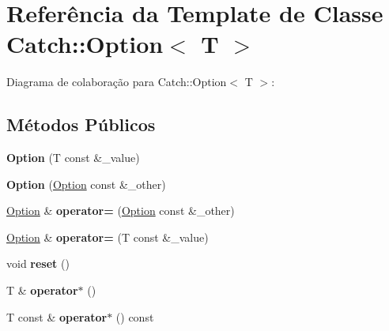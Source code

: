 \hypertarget{classCatch_1_1Option}{}\section{Referência da Template de Classe Catch\+:\+:Option$<$ T $>$}
\label{classCatch_1_1Option}


Diagrama de colaboração para Catch\+:\+:Option$<$ T $>$\+:
\subsection*{Métodos Públicos}
\begin{DoxyCompactItemize}
\item 
{\bfseries Option} (T const \&\+\_\+value)\hypertarget{classCatch_1_1Option_a5aeb9c22d48a6882bdf5fb4730b06c86}{}\label{classCatch_1_1Option_a5aeb9c22d48a6882bdf5fb4730b06c86}

\item 
{\bfseries Option} (\hyperlink{classCatch_1_1Option}{Option} const \&\+\_\+other)\hypertarget{classCatch_1_1Option_af02f2e4559f06384baec0def8c68c5fd}{}\label{classCatch_1_1Option_af02f2e4559f06384baec0def8c68c5fd}

\item 
\hyperlink{classCatch_1_1Option}{Option} \& {\bfseries operator=} (\hyperlink{classCatch_1_1Option}{Option} const \&\+\_\+other)\hypertarget{classCatch_1_1Option_a78c65b15dd6b2fbd04c5012c43017c8f}{}\label{classCatch_1_1Option_a78c65b15dd6b2fbd04c5012c43017c8f}

\item 
\hyperlink{classCatch_1_1Option}{Option} \& {\bfseries operator=} (T const \&\+\_\+value)\hypertarget{classCatch_1_1Option_a2be7e343ab22d6061726d32ab4622653}{}\label{classCatch_1_1Option_a2be7e343ab22d6061726d32ab4622653}

\item 
void {\bfseries reset} ()\hypertarget{classCatch_1_1Option_a37b4e0e5d4d56296adacd267a616f4e0}{}\label{classCatch_1_1Option_a37b4e0e5d4d56296adacd267a616f4e0}

\item 
T \& {\bfseries operator$\ast$} ()\hypertarget{classCatch_1_1Option_afd989852fa453731c3190dac63caccb0}{}\label{classCatch_1_1Option_afd989852fa453731c3190dac63caccb0}

\item 
T const \& {\bfseries operator$\ast$} () const \hypertarget{classCatch_1_1Option_a0f05708905dc6b0b470fb24f5d265631}{}\label{classCatch_1_1Option_a0f05708905dc6b0b470fb24f5d265631}


\end{DoxyCompactItemize}
